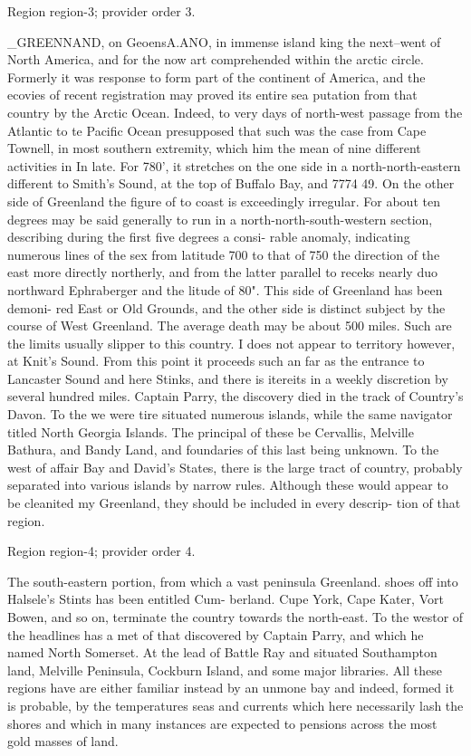 \documentclass[11pt]{article}
\begin{document}
{\scriptsize\color{gray} Region region-3; provider order 3.\par}
\medskip

\_GREENNAND, on GeoensA.ANO, in immense island
king the next–went of North America, and for the now
art comprehended within the arctic circle. Formerly it was
response to form part of the continent of America, and the
ecovies of recent registration may proved its entire sea
putation from that country by the Arctic Ocean. Indeed,
to very days of north-west passage from the Atlantic to
te Pacific Ocean presupposed that such was the case
from Cape Townell, in most southern extremity, which
him the mean of nine different activities in In late.
For 780', it stretches on the one side in a north-north-eastern
different to Smith's Sound, at the top of Buffalo Bay,
and 7774 49. On the other side of Greenland the figure of
to coast is exceedingly irregular. For about ten degrees
may be said generally to run in a north-north-south-western
section, describing during the first five degrees a consi-
rable anomaly, indicating numerous lines of the sex
from latitude 700 to that of 750 the direction of the east
more directly northerly, and from the latter parallel to
receks nearly duo northward Ephraberger and the
litude of 80". This side of Greenland has been demoni-
red East or Old Grounds, and the other side is distinct
subject by the course of West Greenland. The average
death may be about 500 miles. Such are the limits usually
slipper to this country. I does not appear to territory
however, at Knit's Sound. From this point it proceeds
such an far as the entrance to Lancaster Sound and
here Stinks, and there is itereits in a weekly discretion
by several hundred miles. Captain Parry, the discovery
died in the track of Country's Davon. To the we were
tire situated numerous islands, while the same navigator
titled North Georgia Islands. The principal of these
be Cervallis, Melville Bathura, and Bandy Land, and
foundaries of this last being unknown. To the west of
affair Bay and David's States, there is the large tract of
country, probably separated into various islands by narrow
rules. Although these would appear to be cleanited
my Greenland, they should be included in every descrip-
tion of that region.
\par

{\scriptsize\color{gray} Region region-4; provider order 4.\par}
\medskip

The south-eastern portion, from which a vast peninsula Greenland.
shoes off into Halsele's Stints has been entitled Cum-
berland. Cupe York, Cape Kater, Vort Bowen, and so on,
terminate the country towards the north-east. To the
westor of the headlines has a met of that discovered
by Captain Parry, and which he named North Somerset.
At the lead of Battle Ray and situated Southampton
land, Melville Peninsula, Cockburn Island, and some
major libraries. All these regions have are either familiar
instead by an unmone bay and indeed, formed it is
probable, by the temperatures seas and currents which here
necessarily lash the shores and which in many instances
are expected to pensions across the most gold masses of
land.
\par
\end{document}
